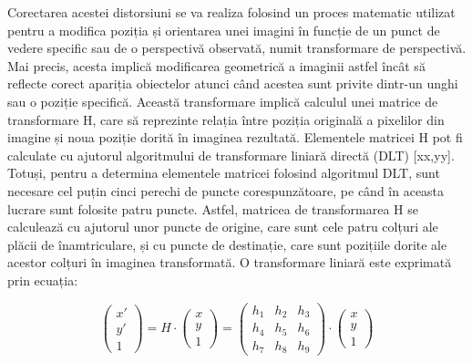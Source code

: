\documentclass[12pt]{article}
\begin{document}
Corectarea acestei distorsiuni se va realiza folosind un proces matematic utilizat pentru a modifica poziția și orientarea unei imagini \^{i}n funcție de un punct de vedere specific sau de o perspectiv\u{a} observat\u{a}, numit transformare de perspectiv\u{a}. Mai precis, acesta implic\u{a} modificarea geometric\u{a} a imaginii astfel \^{i}nc\^{a}t s\u{a} reflecte corect apariția obiectelor atunci c\^{a}nd acestea sunt privite dintr-un unghi sau o poziție specific\u{a}. Aceast\u{a} transformare implic\u{a} calculul unei matrice de transformare H, care s\u{a} reprezinte relația \^{i}ntre poziția original\u{a} a pixelilor din imagine și noua poziție dorit\u{a} \^{i}n imaginea rezultat\u{a}. Elementele matricei H pot fi calculate cu ajutorul algoritmului de transformare liniar\u{a} direct\u{a} (DLT) [xx,yy]. Totuși, pentru a determina elementele matricei folosind algoritmul DLT, sunt necesare cel puțin cinci perechi de puncte corespunz\u{a}toare, pe c\^{a}nd \^{i}n aceasta lucrare sunt folosite patru puncte. Astfel, matricea de transformarea H se calculeaz\u{a} cu ajutorul unor puncte de origine, care sunt cele patru colțuri ale pl\u{a}cii de \^{i}namtriculare, și cu puncte de destinație, care sunt pozițiile dorite ale acestor colțuri \^{i}n imaginea transformat\u{a}. O transformare liniar\u{a} este exprimat\u{a} prin ecuația:

\begin{equation}
\begin{pmatrix} x' \\ y' \\ 1 \end{pmatrix} = H \cdot \begin{pmatrix} x \\ y \\ 1 \end{pmatrix} = \begin{pmatrix} h_1 & h_2 & h_3 \\ h_4 & h_5 & h_6 \\ h_7 & h_8 & h_9 \end{pmatrix} \cdot \begin{pmatrix} x \\ y \\ 1 \end{pmatrix}
\end{equation}
\end{document}
